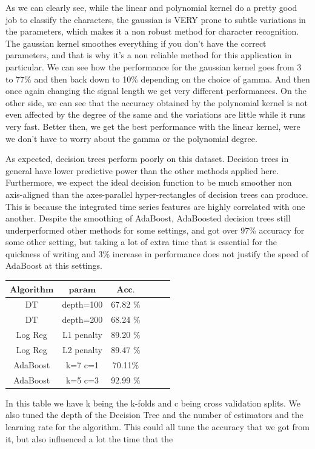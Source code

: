 \documentclass{article}
\begin{document}
As we can clearly see, while the linear and polynomial kernel do a pretty good job to classify the characters, the gaussian is VERY prone to subtle variations in the parameters, which makes it a non robust method for character recognition. The gaussian kernel smoothes everything if you don't have the correct parameters, and that is why it's a non reliable method for this application in particular. We can see how the performance for the gaussian kernel goes from 3 to 77\% and then back down to 10\% depending on the choice of gamma. And then once again changing the signal length we get very different performances. \newline
On the other side, we can see that the accuracy obtained by the polynomial kernel is not even affected by the degree of the same and the variations are little while it runs very fast. Better then, we get the best performance with the linear kernel, were we don't have to worry about the gamma or the polynomial degree.

As expected, decision trees perform poorly on this dataset.  Decision trees in general have lower predictive power than the other methods applied here.  Furthermore, we expect the ideal decision function to be much smoother non axis-aligned than the axes-parallel hyper-rectangles of decision trees can produce.  This is because the integrated time series features are highly correlated with one another.  Despite the smoothing of AdaBoost, AdaBoosted decision trees still underperformed other methods for some settings, and got over 97\% accuracy for some other setting, but taking a lot of extra time that is essential for the quickness of writing and 3\% increase in performance does not justify the speed of AdaBoost at this settings.

\begin{center}
    \begin{tabular}{ | c | c | c | c | c | r |}
    \hline
    $\textbf{Algorithm}$ & $\textbf{param}$ & $\textbf{Acc.}$ \\ \hline
    DT & depth=100 & 67.82 $\%$ \\ \hline
    DT & depth=200 & 68.24 $\%$ \\ \hline
    Log Reg & L1 penalty & 89.20 $\%$ \\ \hline
    Log Reg & L2 penalty & 89.47 $\%$ \\ \hline
    AdaBoost & k=7 c=1 & 70.11$\%$ \\ \hline
    AdaBoost & k=5 c=3 & 92.99 $\%$ \\ \hline
    
    \end{tabular}
\end{center}
In this table we have k being the k-folds and c being cross validation splits. We also tuned the depth of the Decision Tree and the number of estimators and the learning rate for the algorithm. This could all tune the accuracy that we got from it, but also influenced a lot the time that the 
\end{document}
